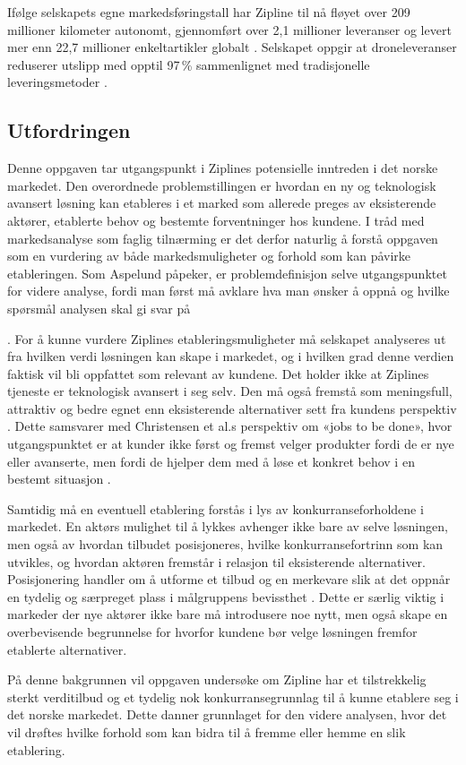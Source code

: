 Ifølge selskapets egne markedsføringstall har Zipline til nå fløyet over 209
millioner kilometer autonomt, gjennomført over 2,1 millioner leveranser og
levert mer enn 22,7 millioner enkeltartikler globalt \parencite{ziplineabout}.
Selskapet oppgir at droneleveranser reduserer utslipp med opptil 97\,\%
sammenlignet med tradisjonelle leveringsmetoder \parencite{zipline_ntia2024}.

\subsection{Utfordringen}

Denne oppgaven tar utgangspunkt i Ziplines potensielle inntreden i det norske
markedet. Den overordnede problemstillingen er hvordan en ny og teknologisk
avansert løsning kan etableres i et marked som allerede preges av eksisterende
aktører, etablerte behov og bestemte forventninger hos kundene. I tråd med
markedsanalyse som faglig tilnærming er det derfor naturlig å forstå oppgaven
som en vurdering av både markedsmuligheter og forhold som kan påvirke
etableringen. Som Aspelund påpeker, er problemdefinisjon selve utgangspunktet
for videre analyse, fordi man først må avklare hva man ønsker å oppnå og
hvilke spørsmål analysen skal gi svar på

\parencite[Forelesning 7]{aspelund2026_forelesninger}.
For å kunne vurdere Ziplines etableringsmuligheter må selskapet analyseres ut
fra hvilken verdi løsningen kan skape i markedet, og i hvilken grad denne
verdien faktisk vil bli oppfattet som relevant av kundene. Det holder ikke at
Ziplines tjeneste er teknologisk avansert i seg selv. Den må også fremstå som
meningsfull, attraktiv og bedre egnet enn eksisterende alternativer sett fra
kundens perspektiv \parencite[Forelesning 2]{aspelund2026_forelesninger}.
Dette samsvarer med
Christensen et al.s perspektiv om «jobs to be done», hvor utgangspunktet er at
kunder ikke først og fremst velger produkter fordi de er nye eller avanserte,
men fordi de hjelper dem med å løse et konkret behov i en bestemt situasjon
\parencite{christensen2016}.

Samtidig må en eventuell etablering forstås i lys av konkurranseforholdene i
markedet. En aktørs mulighet til å lykkes avhenger ikke bare av selve
løsningen, men også av hvordan tilbudet posisjoneres, hvilke
konkurransefortrinn som kan utvikles, og hvordan aktøren fremstår i relasjon
til eksisterende alternativer. Posisjonering handler om å utforme et tilbud og
en merkevare slik at det oppnår en tydelig og særpreget plass i målgruppens
bevissthet \parencite[Forelesning 5]{aspelund2026_forelesninger}. Dette er
særlig viktig i
markeder der nye aktører ikke bare må introdusere noe nytt, men også skape en
overbevisende begrunnelse for hvorfor kundene bør velge løsningen fremfor
etablerte alternativer.

På denne bakgrunnen vil oppgaven undersøke om Zipline har et tilstrekkelig
sterkt verditilbud og et tydelig nok konkurransegrunnlag til å kunne etablere
seg i det norske markedet. Dette danner grunnlaget for den videre analysen,
hvor det vil drøftes hvilke forhold som kan bidra til å fremme eller hemme en
slik etablering.
